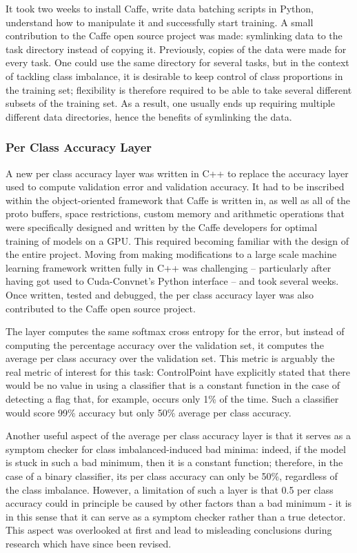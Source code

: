 \documentclass[a4paper,11pt]{article}
\begin{document}
It took two weeks to install Caffe, write data batching scripts in Python, understand how to manipulate it and successfully start training. A small contribution to the Caffe open source project was made: symlinking data to the task directory instead of copying it. Previously, copies of the data were made for every task. One could use the same directory for several tasks, but in the context of tackling class imbalance, it is desirable to keep control of class proportions in the training set; flexibility is therefore required to be able to take several different subsets of the training set. As a result, one usually ends up requiring multiple different data directories, hence the benefits of symlinking the data. 


\subsubsection{Per Class Accuracy Layer}

A new per class accuracy layer was written in C++ to replace the accuracy layer used to compute validation error and validation accuracy. It had to be inscribed within the object-oriented framework that Caffe is written in, as well as all of the proto buffers, space restrictions, custom memory and arithmetic operations that were specifically designed and written by the Caffe developers for optimal training of models on a GPU. This required becoming familiar with the design of the entire project. Moving from making modifications to a large scale machine learning framework written fully in C++ was challenging -- particularly after having got used to Cuda-Convnet's Python interface -- and took several weeks. Once written, tested and debugged, the per class accuracy layer was also contributed to the Caffe open source project. 

The layer computes the same softmax cross entropy for the error, but instead of computing the percentage accuracy over the validation set, it computes the average per class accuracy over the validation set. This metric is arguably the real metric of interest for this task: ControlPoint have explicitly stated that there would be no value in using a classifier that is a constant function in the case of detecting a flag that, for example, occurs only 1\% of the time. Such a classifier would score 99\% accuracy but only 50\% average per class accuracy.

Another useful aspect of the average per class accuracy layer is that it serves as a symptom checker for class imbalanced-induced bad minima: indeed, if the model is stuck in such a bad minimum, then it is a constant function; therefore, in the case of a binary classifier, its per class accuracy can only be 50\%, regardless of the class imbalance. However, a limitation of such a layer is that 0.5 per class accuracy could in principle be caused by other factors than a bad minimum - it is in this sense that it can serve as a symptom checker rather than a true detector. This aspect was overlooked at first and lead to misleading conclusions during research which have since been revised. 
\end{document}
